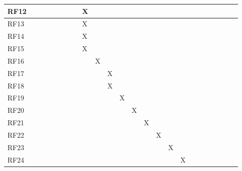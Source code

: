 \begin{table}[H]
\begin{tabular}{|l|l|l|l|l|l|l|l|l|l|l|l|l|l|l|l|l|l|l|l|l|l|l|l|}
RF12&      &      &      &      &      &      &      &   X   &      &      &      &      &      &      &      &      &      &      &      &      &      &      &      \\ \hline
RF13&      &      &      &      &      &      &      &   X   &      &      &      &      &      &      &      &      &      &      &      &      &      &      &      \\ \hline
RF14&      &      &      &      &      &      &      &   X   &      &      &      &      &      &      &      &      &      &      &      &      &      &      &      \\ \hline
RF15&      &      &      &      &      &      &      &   X   &      &      &      &      &      &      &      &      &      &      &      &      &      &      &      \\ \hline
RF16&      &      &      &      &      &      &      &      &   X   &      &      &      &      &      &      &      &      &      &      &      &      &      &      \\ \hline
RF17&      &      &      &      &      &      &      &      &      &   X   &      &      &      &      &      &      &      &      &      &      &      &      &      \\ \hline
RF18&      &      &      &      &      &      &      &      &      &   X   &      &      &      &      &      &      &      &      &      &      &      &      &      \\ \hline
RF19&      &      &      &      &      &      &      &      &      &      &    X  &      &      &      &      &      &      &      &      &      &      &      &      \\ \hline
RF20&      &      &      &      &      &      &      &      &      &      &      &   X   &      &      &      &      &      &      &      &      &      &      &      \\ \hline
RF21&      &      &      &      &      &      &      &      &      &      &      &      &   X   &      &      &      &      &      &      &      &      &      &      \\ \hline
RF22&      &      &      &      &      &      &      &      &      &      &      &      &      &   X   &      &      &      &      &      &      &      &      &      \\ \hline
RF23&      &      &      &      &      &      &      &      &      &      &      &      &      &      &   X   &      &      &      &      &      &      &      &      \\ \hline
RF24&      &      &      &      &      &      &      &      &      &      &      &      &      &      &      &   X   &      &      &      &      &      &      &      \\ \hline

\end{tabular}
\end{table}
